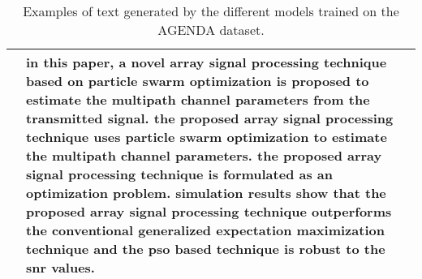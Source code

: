 \documentclass[11pt]{article}
\begin{document}
\begin{table*}[h]
\begin{center}
\begin{tabular}{lp{12cm}}
 \midrule
  \citet{ribeiro-etal-2020-modeling}  & in this paper, a novel array signal processing technique based on particle swarm optimization is proposed to estimate the multipath channel parameters from the transmitted signal. the proposed array signal processing technique uses particle swarm optimization to estimate the multipath channel parameters. the proposed array signal processing technique is formulated as an optimization problem. simulation results show that the proposed array signal processing technique outperforms the conventional generalized expectation maximization technique and the pso based technique is robust to the snr values. \\

\midrule
\end{tabular} 
\caption{Examples of text generated by the different models trained on the AGENDA dataset.}\label{tab:human_examples_agenda}
\end{center}
\end{table*} 

 
\end{document}
